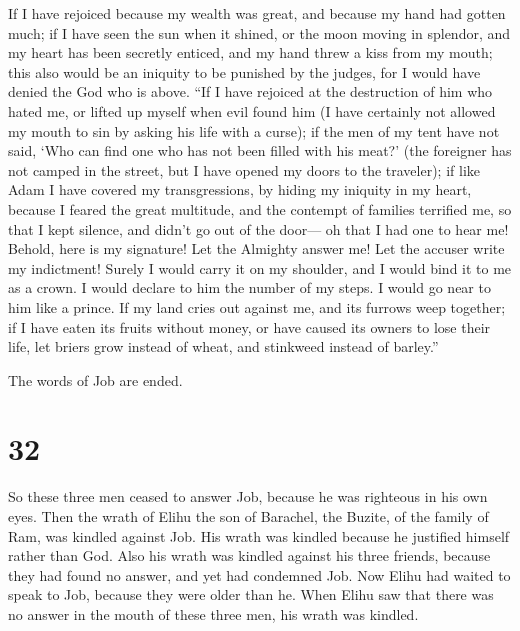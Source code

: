  If I have rejoiced because my wealth was great, and
because my hand had gotten much;  if I have seen the sun
when it shined, or the moon moving in splendor,  and my
heart has been secretly enticed, and my hand threw a kiss from my mouth;
 this also would be an iniquity to be punished by the
judges, for I would have denied the God who is above. 
``If I have rejoiced at the destruction of him who hated me, or lifted
up myself when evil found him  (I have certainly not
allowed my mouth to sin by asking his life with a curse);
 if the men of my tent have not said, `Who can find one
who has not been filled with his meat?'  (the foreigner
has not camped in the street, but I have opened my doors to the
traveler);  if like Adam I have covered my
transgressions, by hiding my iniquity in my heart, 
because I feared the great multitude, and the contempt of families
terrified me, so that I kept silence, and didn't go out of the door---
 oh that I had one to hear me! Behold, here is my
signature! Let the Almighty answer me! Let the accuser write my
indictment!  Surely I would carry it on my shoulder, and
I would bind it to me as a crown.  I would declare to him
the number of my steps. I would go near to him like a prince.
 If my land cries out against me, and its furrows weep
together;  if I have eaten its fruits without money, or
have caused its owners to lose their life,  let briers
grow instead of wheat, and stinkweed instead of barley.''

The words of Job are ended.

\hypertarget{section-31}{%
\section{32}\label{section-31}}

 So these three men ceased to answer Job, because he was
righteous in his own eyes.  Then the wrath of Elihu the
son of Barachel, the Buzite, of the family of Ram, was kindled against
Job. His wrath was kindled because he justified himself rather than God.
 Also his wrath was kindled against his three friends,
because they had found no answer, and yet had condemned Job.
 Now Elihu had waited to speak to Job, because they were
older than he.  When Elihu saw that there was no answer in
the mouth of these three men, his wrath was kindled.

